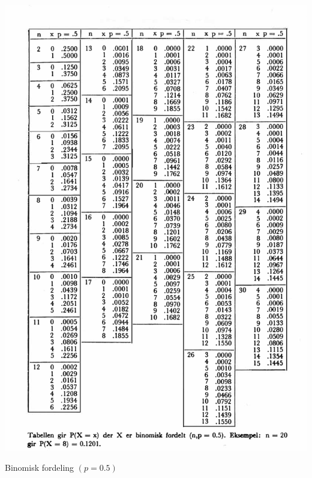 \begin{table}[H]
\centering
  \includegraphics[scale=1.0]{figurer/Tabell_2b_Binomisk_fordeling.pdf}
 \caption{Binomisk fordeling $(p=0.5)$}
 \label{tab:Binomisk_fordeling_p05} %
\end{table}

